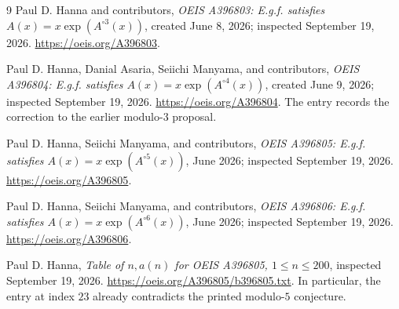\documentclass[11pt,letterpaper]{article}
\theoremstyle{definition}
\theoremstyle{remark}
\begin{document}
\clearpage
\begin{thebibliography}{9}
Paul D. Hanna and contributors,
\emph{OEIS A396803: E.g.f. satisfies $A(x)=x\exp(A^{\circ3}(x))$},
created June 8, 2026; inspected September 19, 2026.
\url{https://oeis.org/A396803}.

Paul D. Hanna, Danial Asaria, Seiichi Manyama, and contributors,
\emph{OEIS A396804: E.g.f. satisfies $A(x)=x\exp(A^{\circ4}(x))$},
created June 9, 2026; inspected September 19, 2026.
\url{https://oeis.org/A396804}.
The entry records the correction to the earlier modulo-$3$ proposal.

Paul D. Hanna, Seiichi Manyama, and contributors,
\emph{OEIS A396805: E.g.f. satisfies $A(x)=x\exp(A^{\circ5}(x))$},
June 2026; inspected September 19, 2026.
\url{https://oeis.org/A396805}.

Paul D. Hanna, Seiichi Manyama, and contributors,
\emph{OEIS A396806: E.g.f. satisfies $A(x)=x\exp(A^{\circ6}(x))$},
June 2026; inspected September 19, 2026.
\url{https://oeis.org/A396806}.

Paul D. Hanna,
\emph{Table of $n,a(n)$ for OEIS A396805, $1\le n\le200$},
inspected September 19, 2026.
\url{https://oeis.org/A396805/b396805.txt}.
In particular, the entry at index $23$ already contradicts the printed
modulo-$5$ conjecture.
\end{thebibliography}
\end{document}
